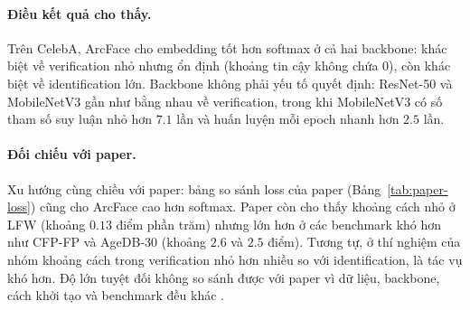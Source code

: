 \documentclass[a4paper,12pt]{article}
\begin{document}
\paragraph{Điều kết quả cho thấy.} Trên CelebA, ArcFace cho embedding tốt hơn softmax ở cả hai backbone: khác biệt về verification nhỏ nhưng ổn định (khoảng tin cậy không chứa $0$), còn khác biệt về identification lớn. Backbone không phải yếu tố quyết định: ResNet-50 và MobileNetV3 gần như bằng nhau về verification, trong khi MobileNetV3 có số tham số suy luận nhỏ hơn $7.1$ lần và huấn luyện mỗi epoch nhanh hơn $2.5$ lần.

\paragraph{Đối chiếu với paper.} Xu hướng cùng chiều với paper: bảng so sánh loss của paper (Bảng~\ref{tab:paper-loss}) cũng cho ArcFace cao hơn softmax. Paper còn cho thấy khoảng cách nhỏ ở LFW (khoảng $0.13$ điểm phần trăm) nhưng lớn hơn ở các benchmark khó hơn như CFP-FP và AgeDB-30 (khoảng $2.6$ và $2.5$ điểm). Tương tự, ở thí nghiệm của nhóm khoảng cách trong verification nhỏ hơn nhiều so với identification, là tác vụ khó hơn. Độ lớn tuyệt đối không so sánh được với paper vì dữ liệu, backbone, cách khởi tạo và benchmark đều khác \cite{deng2018arcfacev1}.
\end{document}
